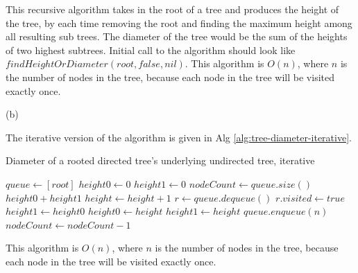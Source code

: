\documentclass{article}
\begin{document}
\begin{description}
  This recursive algorithm takes in the root of a tree and produces the height of the tree, by each time removing the root and finding the maximum height among all resulting sub trees. The diameter of the tree would be the sum of the heights of two highest subtrees. Initial call to the algorithm should look like $findHeightOrDiameter(root, false, nil)$. This algorithm is $O(n)$, where $n$ is the number of nodes in the tree, because each node in the tree will be visited exactly once.

  (b)

  The iterative version of the algorithm is given in Alg \ref{alg:tree-diameter-iterative}.

  \begin{algorithm}[h]
  \caption{Diameter of a rooted directed tree's underlying undirected tree, iterative}
  \label{alg:tree-diameter-iterative}
    \begin{algorithmic}[1]
      \State $queue \gets [root]$
      \State $height0 \gets 0$
      \State $height1 \gets 0$
        \State $nodeCount \gets queue.size()$
          \State \Return $height0 + height1$
        \EndIf
        \State $height \gets height + 1$
          \State $r \gets queue.dequeue()$
          \State $r.visited \gets true$
              \State $height1 \gets height0$
              \State $height0 \gets height$
              \State $height1 \gets height$
            \EndIf
          \Else
              \State $queue.enqueue(n)$
            \EndFor
          \EndIf
          \State $nodeCount \gets nodeCount - 1$
        \EndWhile
      \EndWhile
    \EndFunction
    \end{algorithmic}
  \end{algorithm}

  This algorithm is $O(n)$, where $n$ is the number of nodes in the tree, because each node in the tree will be visited exactly once.

\end{description}
\end{document}

